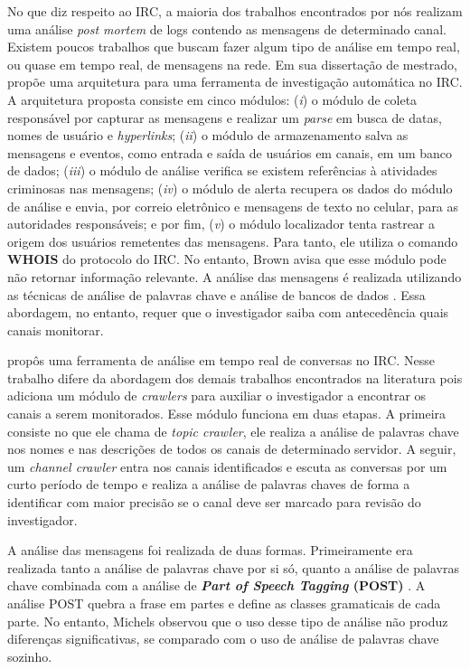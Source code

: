 \documentclass[12pt]{article}
\begin{document}
No que diz respeito ao IRC, a maioria dos trabalhos encontrados por nós
realizam uma análise \textit{post mortem} de logs contendo as mensagens de
determinado canal.
%
Existem poucos trabalhos que buscam fazer algum tipo de análise em tempo real,
ou quase em tempo real, de mensagens na rede.
%
Em sua dissertação de mestrado, \cite{brown2007} propõe uma arquitetura para
uma ferramenta de investigação automática no IRC. A arquitetura proposta
consiste em cinco módulos: (\textit{i}) o módulo de coleta responsável por
capturar as mensagens e realizar um \textit{parse} em busca de datas, nomes
de usuário e \textit{hyperlinks};
%
(\textit{ii}) o módulo de armazenamento
salva as mensagens e eventos, como entrada e saída de usuários em canais, em
um banco de dados;
%
(\textit{iii}) o módulo de análise verifica se existem referências à atividades
criminosas nas mensagens;
%
(\textit{iv}) o módulo de alerta recupera os dados do módulo de análise e envia,
por correio eletrônico e mensagens de texto no celular, para as autoridades responsáveis;
%
e por fim, (\textit{v}) o módulo localizador tenta rastrear a origem dos
usuários remetentes das mensagens. Para tanto, ele utiliza o comando \textbf{WHOIS} do
protocolo do IRC. No entanto, Brown avisa que esse módulo pode não
retornar informação relevante.
%
A análise das mensagens é realizada utilizando as técnicas de análise de
palavras chave e análise de bancos de dados \cite{brown2007}.
%
Essa abordagem, no entanto, requer que o investigador saiba com antecedência
quais canais monitorar.

\cite{michels2012} propôs uma ferramenta de análise em tempo real de
conversas no IRC. Nesse trabalho difere da abordagem dos demais trabalhos
encontrados na literatura pois adiciona um módulo de \textit{crawlers} para
auxiliar o investigador a encontrar os canais a serem monitorados.
%
Esse módulo funciona em duas etapas. A primeira consiste no que ele chama de
\textit{topic crawler}, ele realiza a análise de palavras chave nos nomes e
nas descrições de todos os canais de determinado servidor. A seguir, um
\textit{channel crawler} entra nos canais identificados e escuta as conversas
por um curto período de tempo e realiza a análise de palavras chaves de forma
a identificar com maior precisão se o canal deve ser marcado para revisão do
investigador.

A análise das mensagens foi realizada de duas formas. Primeiramente era
realizada tanto a análise de palavras chave por si só, quanto a análise de
palavras chave combinada com a análise de \textbf{\textit{Part of Speech
Tagging} (POST)} \cite{stanford}. A análise POST quebra a frase em partes e
define as classes gramaticais de cada parte. No entanto, Michels
observou que o uso desse tipo de análise não produz diferenças significativas,
se comparado com o uso de análise de palavras chave sozinho.
\end{document}
